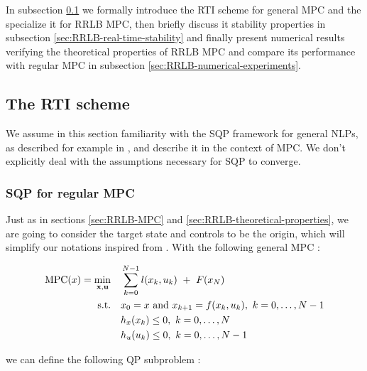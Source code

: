 \documentclass[12pt]{article}
\begin{document}
In subsection \ref{sec:RTI-scheme} we formally introduce the RTI scheme for general MPC and the specialize it for RRLB MPC, then briefly discuss it stability properties in subsection \ref{sec:RRLB-real-time-stability} and finally present numerical results verifying the theoretical properties of RRLB MPC and compare its performance with regular MPC in subsection \ref{sec:RRLB-numerical-experiments}.

\subsection{The RTI scheme}\label{sec:RTI-scheme}

We assume in this section familiarity with the SQP framework for general NLPs, as described for example in \cite{nocedal-wright}, and describe it in the context of MPC.
We don't explicitly deal with the assumptions necessary for SQP to converge.

\subsubsection{SQP for regular MPC}

Just as in sections \ref{sec:RRLB-MPC} and \ref{sec:RRLB-theoretical-properties}, we are going to consider the target state and controls to be the origin, which will simplify our notations inspired from \cite{mpc-rti}.
With the following general MPC :

\begin{align*}
	\mathrm{MPC}(x)=\underset{\bf{x},\bf{u}}{\min} &\quad \sum_{k=0}^{N-1}l(x_k,u_k)~+~F(x_N)\\
	\text{s.t.} &\quad x_0=x\text{ and }x_{k+1}=f(x_k,u_k),~k=0,\dots,N-1\\
	&\quad h_x(x_k)\leq 0,~k=0,\dots,N\\
	&\quad h_u(u_k)\leq 0,~k=0,\dots,N-1
\end{align*}

\noindent we can define the following QP subproblem :
\end{document}
